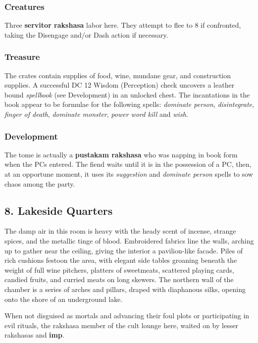 \documentclass[10pt,a4paper,twoside,bg=print,twocolumn,openany,nodeprecatedcode]{dndbook}
\begin{document}
\subsubsection{Creatures}
Three \textbf{servitor rakshasa} labor here. They attempt to flee to 8 if confronted, taking the Disengage and/or Dash action if necessary.

\subsubsection{Treasure}
The crates contain supplies of food, wine, mundane gear, and construction supplies. A successful DC 12 Wisdom (Perception) check uncovers a leather bound \textit{spellbook} (see Development) in an unlocked chest. The incantations in the book appear to be formulae for the following spells: \textit{dominate person}, \textit{disintegrate}, \textit{finger of death}, \textit{dominate monster}, \textit{power word kill} and \textit{wish}.

\subsubsection{Development}
The tome is actually a \textbf{pustakam rakshasa} who was napping in book form when the PCs entered. The fiend waits until it is in the possession of a PC, then, at an opportune moment, it uses its \textit{suggestion} and \textit{dominate person} spells to sow chaos among the party.

\subsection{8. Lakeside Quarters}
\begin{DndReadAloud}{}
The damp air in this room is heavy with the heady scent of incense, strange spices, and the metallic tinge of blood. Embroidered fabrics line the walls, arching up to gather near the ceiling, giving the interior a pavilion-like facade. Piles of rich cushions festoon the area, with elegant side tables groaning beneath the weight of full wine pitchers, platters of sweetmeats, scattered playing cards, candied fruits, and curried meats on long skewers. The northern wall of the chamber is a series of arches and pillars, draped with diaphanous silks, opening onto the shore of an underground lake.

\end{DndReadAloud}

When not disguised as mortals and advancing their foul plots or participating in evil rituals, the rakshasa member of the cult lounge here, waited on by lesser rakshasas and \textbf{imp}.
\end{document}
